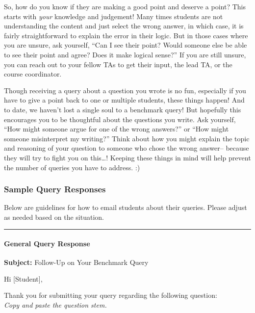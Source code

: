 \documentclass[
]{article}
\begin{document}
So, how do you know if they are making a good point and deserve a point? This starts with \emph{your} knowledge and judgement! Many times students are not understanding the content and just select the wrong answer, in which case, it is fairly straightforward to explain the error in their logic. But in those cases where you are unsure, ask yourself, ``Can I see their point? Would someone else be able to see their point and agree? Does it make logical sense?'' If you are still unsure, you can reach out to your fellow TAs to get their input, the lead TA, or the course coordinator.

Though receiving a query about a question you wrote is no fun, especially if you have to give a point back to one or multiple students, these things happen! And to date, we haven't lost a single soul to a benchmark query! But hopefully this encourages you to be thoughtful about the questions you write. Ask yourself, ``How might someone argue for one of the wrong answers?'' or ``How might someone misinterpret my writing?'' Think about how you might explain the topic and reasoning of your question to someone who chose the wrong answer-- because they will try to fight you on this\ldots! Keeping these things in mind will help prevent the number of queries you have to address. :)

\hypertarget{sample-query-responses}{%
\subsubsection{Sample Query Responses}\label{sample-query-responses}}

Below are guidelines for how to email students about their queries. Please adjust as needed based on the situation.

\begin{center}\rule{0.5\linewidth}{0.5pt}\end{center}

\hypertarget{general-query-response}{%
\paragraph{General Query Response}\label{general-query-response}}

\textbf{Subject:} Follow-Up on Your Benchmark Query

Hi {[}Student{]},

Thank you for submitting your query regarding the following question:\\
\emph{Copy and paste the question stem.}
\end{document}
